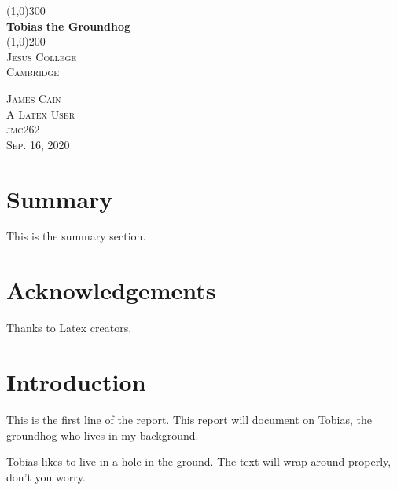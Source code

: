 \documentclass{article}
\begin{document}
\begin{titlepage}
    \begin{center}
    \line(1,0){300}\\
    [0.25in]
    \huge{\bfseries Tobias the Groundhog}\\
    [2mm]
    \line(1,0){200}\\
    [1.5cm]
    \textsc{\LARGE Jesus College}\\
    \textsc{\LARGE Cambridge}\\
    [10cm]
    \end{center}
    
    \begin{flushright}
    \textsc{\large James Cain \\
    A Latex User\\
    jmc262\\
    Sep. 16, 2020\\}
    \end{flushright}
\end{titlepage}

\section*{Summary}

This is the summary section. 
\cleardoublepage

\section*{Acknowledgements}
Thanks to Latex creators.
\cleardoublepage

\tableofcontents
\thispagestyle{empty}
\cleardoublepage

\setcounter{page}{1}

\section{Introduction}\label{sec:intro}
This is the first line of the report. This report will document on Tobias, the groundhog who lives in my background.

Tobias likes to live in a hole in the ground. The text will wrap around properly, don't you worry.

\lipsum[1]
\end{document}
